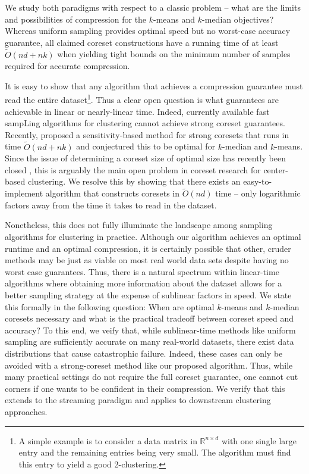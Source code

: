 We study both paradigms with respect to a classic problem -- what are the limits and possibilities of compression for the $k$-means and $k$-median objectives?
Whereas uniform sampling provides optimal speed but no worst-case accuracy guarantee, all claimed coreset constructions have a running time of at least
$\tilde{O}(nd+nk)$ when yielding tight bounds on the minimum number of samples required for accurate compression. 

It is easy to show that any algorithm that achieves a compression guarantee must read the entire dataset\footnote{A simple example is to consider a data matrix
in $\mathbb{R}^{n \times d}$ with one single large entry and the remaining entries being very small. The algorithm must find this entry to yield a good
2-clustering.}. Thus a clear open question is what guarantees are achievable in linear or nearly-linear time. Indeed, currently available fast sampLing
algorithms for clustering \cite{lightweight_coresets} \cite{kmeans_sublinear_bachem16} cannot achieve strong coreset guarantees.  Recently, \cite{DSWY22} proposed
a sensitivity-based method for strong coresets that runs in time $\tilde{O}(nd + nk)$ and conjectured this to be optimal for $k$-median and $k$-means.  Since
the issue of determining a coreset size of optimal size has recently been closed \cite{CSS21,CLSSS22,huangLB}, this is arguably the main open problem in coreset
research for center-based clustering. We resolve this by showing that there exists an easy-to-implement algorithm that constructs coresets in $\tilde{O}(nd)$
time -- only logarithmic factors away from the time it takes to read in the dataset.

Nonetheless, this does not fully illuminate the landscape among sampling algorithms for clustering in practice. Although our algorithm achieves an optimal
runtime and an optimal compression, it is certainly possible that other, cruder methods may be just as viable on most real world data sets despite having no
worst case guarantees.  Thus, there is a natural spectrum within linear-time algorithms where obtaining more information about the dataset allows for a better
sampling strategy at the expense of sublinear factors in speed. We state this formally in the following question: When are optimal $k$-means and $k$-median
coresets necessary and what is the practical tradeoff between coreset speed and accuracy? To this end, we veify that, while sublinear-time methods like uniform
sampling are sufficiently accurate on many real-world datasets, there exist data distributions that cause catastrophic failure. Indeed, these cases can only be
avoided with a strong-coreset method like our proposed algorithm. Thus, while many practical settings do not require the full coreset guarantee, one cannot cut
corners if one wants to be confident in their compression. We verify that this extends to the streaming paradigm and applies to downstream clustering
approaches.

